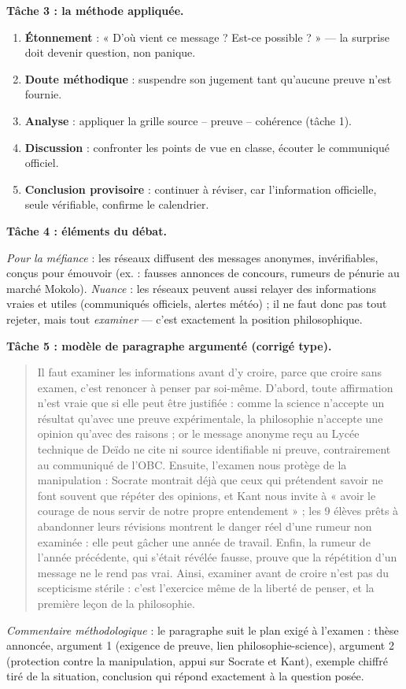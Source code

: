 \documentclass[11pt]{article}
\begin{document}
\begin{exoresolu}
\textbf{Tâche 3 : la méthode appliquée.}

\begin{enumerate}
\item \textbf{Étonnement} : « D'où vient ce message ? Est-ce possible ? » — la surprise doit devenir question, non panique.
\item \textbf{Doute méthodique} : suspendre son jugement tant qu'aucune preuve n'est fournie.
\item \textbf{Analyse} : appliquer la grille source -- preuve -- cohérence (tâche 1).
\item \textbf{Discussion} : confronter les points de vue en classe, écouter le communiqué officiel.
\item \textbf{Conclusion provisoire} : continuer à réviser, car l'information officielle, seule vérifiable, confirme le calendrier.
\end{enumerate}

\textbf{Tâche 4 : éléments du débat.}

\emph{Pour la méfiance} : les réseaux diffusent des messages anonymes, invérifiables, conçus pour émouvoir (ex. : fausses annonces de concours, rumeurs de pénurie au marché Mokolo). \emph{Nuance} : les réseaux peuvent aussi relayer des informations vraies et utiles (communiqués officiels, alertes météo) ; il ne faut donc pas tout rejeter, mais tout \emph{examiner} — c'est exactement la position philosophique.

\textbf{Tâche 5 : modèle de paragraphe argumenté (corrigé type).}

\begin{quote}
Il faut examiner les informations avant d'y croire, parce que croire sans examen, c'est renoncer à penser par soi-même. D'abord, toute affirmation n'est vraie que si elle peut être justifiée : comme la science n'accepte un résultat qu'avec une preuve expérimentale, la philosophie n'accepte une opinion qu'avec des raisons ; or le message anonyme reçu au Lycée technique de Deïdo ne cite ni source identifiable ni preuve, contrairement au communiqué de l'OBC. Ensuite, l'examen nous protège de la manipulation : Socrate montrait déjà que ceux qui prétendent savoir ne font souvent que répéter des opinions, et Kant nous invite à « avoir le courage de nous servir de notre propre entendement » ; les 9 élèves prêts à abandonner leurs révisions montrent le danger réel d'une rumeur non examinée : elle peut gâcher une année de travail. Enfin, la rumeur de l'année précédente, qui s'était révélée fausse, prouve que la répétition d'un message ne le rend pas vrai. Ainsi, examiner avant de croire n'est pas du scepticisme stérile : c'est l'exercice même de la liberté de penser, et la première leçon de la philosophie.
\end{quote}

\emph{Commentaire méthodologique} : le paragraphe suit le plan exigé à l'examen : thèse annoncée, argument 1 (exigence de preuve, lien philosophie-science), argument 2 (protection contre la manipulation, appui sur Socrate et Kant), exemple chiffré tiré de la situation, conclusion qui répond exactement à la question posée.
\end{exoresolu}
\end{document}
